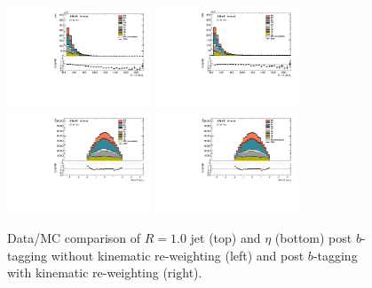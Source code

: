 \begin{figure}[htbp]
  \centering
 \includegraphics[width=0.38\textwidth]{figures/gbb/LargeRJet_pT_PreReweight.pdf}
 \includegraphics[width=0.38\textwidth]{figures/gbb/LargeRJet_pT_Reweight.pdf}
 \includegraphics[width=0.38\textwidth]{figures/gbb/LargeRJet_eta_PreReweight.pdf}
 \includegraphics[width=0.38\textwidth]{figures/gbb/LargeRJet_eta_Reweight.pdf}
\caption{Data/MC comparison of $R=1.0$ jet \pt (top) and $\eta$ (bottom) post $b$-tagging without kinematic re-weighting (left) and post $b$-tagging with kinematic re-weighting (right).}%
  \label{fig:gbb-pT_largeR}
\end{figure}


